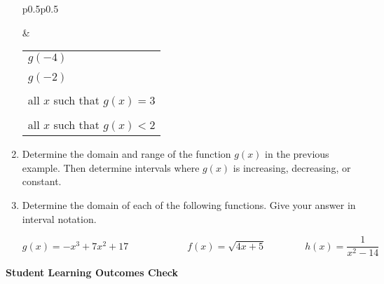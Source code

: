 \begin{enumerate}
\begin{tabular}{p{0.5\textwidth}p{0.5\textwidth}}
\begin{tikzpicture}[y=0.75cm, x=0.75cm,font=\sffamily]
\begin{scope}

          \end{scope}
        \end{tikzpicture}
&
\begin{tabular}{l }
 $g(-4)$ \\ \\
 $g(-2)$ \\ \\
 all $x$ such that $g(x)=3$ \\ \\
 all $x$ such that $g(x)<2$ \\[1.5in]
\end{tabular}
\end{tabular}




\clearpage

\noindent
{}

\noindent
{}

\item Determine the domain and range of the function $g(x)$ in the previous example. Then determine intervals where $g(x)$ is increasing, decreasing, or constant.\\[1in]


\item Determine the domain of each of the following functions. Give your answer in interval notation.

\vspace{-.1in}
$$g(x) = -x^3 + 7x^2 + 17 \quad \quad \quad \quad \quad \quad f(x)=\sqrt{4x+5} \quad \quad  \quad \quad h(x)=\dfrac{1}{x^2-14}$$
\vfill



\end{enumerate}

\noindent \textbf{Student Learning Outcomes Check}

